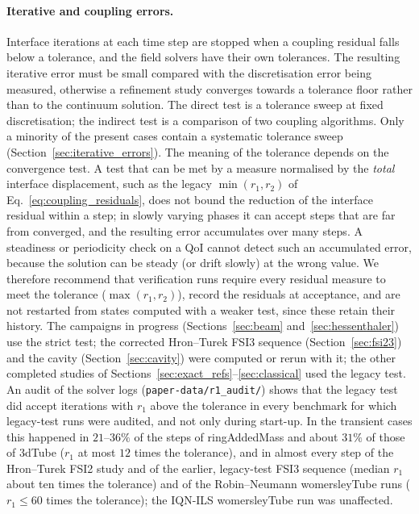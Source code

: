 \paragraph{Iterative and coupling errors.}
Interface iterations at each time step are stopped when a coupling residual falls below a tolerance, and the field solvers have their own tolerances.
The resulting iterative error must be small compared with the discretisation error being measured, otherwise a refinement study converges towards a tolerance floor rather than to the continuum solution.
The direct test is a tolerance sweep at fixed discretisation; the indirect test is a comparison of two coupling algorithms.
Only a minority of the present cases contain a systematic tolerance sweep (Section~\ref{sec:iterative_errors}).
The meaning of the tolerance depends on the convergence test.
A test that can be met by a measure normalised by the \emph{total} interface displacement, such as the legacy $\min(r_1, r_2)$ of Eq.~\eqref{eq:coupling_residuals}, does not bound the reduction of the interface residual within a step; in slowly varying phases it can accept steps that are far from converged, and the resulting error accumulates over many steps.
A steadiness or periodicity check on a QoI cannot detect such an accumulated error, because the solution can be steady (or drift slowly) at the wrong value.
We therefore recommend that verification runs require every residual measure to meet the tolerance ($\max(r_1, r_2)$), record the residuals at acceptance, and are not restarted from states computed with a weaker test, since these retain their history.
The campaigns in progress (Sections~\ref{sec:beam} and~\ref{sec:hessenthaler}) use the strict test; the corrected Hron--Turek FSI3 sequence (Section~\ref{sec:fsi23}) and the cavity (Section~\ref{sec:cavity}) were computed or rerun with it; the other completed studies of Sections~\ref{sec:exact_refs}--\ref{sec:classical} used the legacy test.
An audit of the solver logs (\texttt{paper-data/r1\_audit/}) shows that the legacy test did accept iterations with $r_1$ above the tolerance in every benchmark for which legacy-test runs were audited, and not only during start-up.
In the transient cases this happened in $21$--$36\%$ of the steps of ringAddedMass and about $31\%$ of those of 3dTube ($r_1$ at most $12$ times the tolerance), and in almost every step of the Hron--Turek FSI2 study and of the earlier, legacy-test FSI3 sequence (median $r_1$ about ten times the tolerance) and of the Robin--Neumann womersleyTube runs ($r_1\leq60$ times the tolerance); the IQN-ILS womersleyTube run was unaffected.
